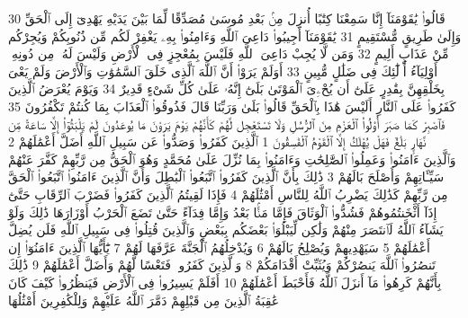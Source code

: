 {\tiny\colorbox{cl_aya}{30}} قَالُوا۟ يَٰقَوْمَنَآ إِنَّا سَمِعْنَا كِتَٰبًا أُنزِلَ مِنۢ بَعْدِ مُوسَىٰ مُصَدِّقًا لِّمَا بَيْنَ يَدَيْهِ يَهْدِىٓ إِلَى ٱلْحَقِّ وَإِلَىٰ طَرِيقٍ مُّسْتَقِيمٍ
{\tiny\colorbox{cl_aya}{31}} يَٰقَوْمَنَآ أَجِيبُوا۟ دَاعِىَ ٱللَّهِ وَءَامِنُوا۟ بِهِۦ يَغْفِرْ لَكُم مِّن ذُنُوبِكُمْ وَيُجِرْكُم مِّنْ عَذَابٍ أَلِيمٍ
{\tiny\colorbox{cl_aya}{32}} وَمَن لَّا يُجِبْ دَاعِىَ ٱللَّهِ فَلَيْسَ بِمُعْجِزٍ فِى ٱلْأَرْضِ وَلَيْسَ لَهُۥ مِن دُونِهِۦٓ أَوْلِيَآءُ أُو۟لَٰٓئِكَ فِى ضَلَٰلٍ مُّبِينٍ
{\tiny\colorbox{cl_aya}{33}} أَوَلَمْ يَرَوْا۟ أَنَّ ٱللَّهَ ٱلَّذِى خَلَقَ ٱلسَّمَٰوَٰتِ وَٱلْأَرْضَ وَلَمْ يَعْىَ بِخَلْقِهِنَّ بِقَٰدِرٍ عَلَىٰٓ أَن يُحْۦِىَ ٱلْمَوْتَىٰ بَلَىٰٓ إِنَّهُۥ عَلَىٰ كُلِّ شَىْءٍ قَدِيرٌ
{\tiny\colorbox{cl_aya}{34}} وَيَوْمَ يُعْرَضُ ٱلَّذِينَ كَفَرُوا۟ عَلَى ٱلنَّارِ أَلَيْسَ هَٰذَا بِٱلْحَقِّ قَالُوا۟ بَلَىٰ وَرَبِّنَا قَالَ فَذُوقُوا۟ ٱلْعَذَابَ بِمَا كُنتُمْ تَكْفُرُونَ
{\tiny\colorbox{cl_aya}{35}} فَٱصْبِرْ كَمَا صَبَرَ أُو۟لُوا۟ ٱلْعَزْمِ مِنَ ٱلرُّسُلِ وَلَا تَسْتَعْجِل لَّهُمْ كَأَنَّهُمْ يَوْمَ يَرَوْنَ مَا يُوعَدُونَ لَمْ يَلْبَثُوٓا۟ إِلَّا سَاعَةً مِّن نَّهَارٍۭ بَلَٰغٌ فَهَلْ يُهْلَكُ إِلَّا ٱلْقَوْمُ ٱلْفَٰسِقُونَ
{\tiny\colorbox{cl_aya}{1}} ٱلَّذِينَ كَفَرُوا۟ وَصَدُّوا۟ عَن سَبِيلِ ٱللَّهِ أَضَلَّ أَعْمَٰلَهُمْ
{\tiny\colorbox{cl_aya}{2}} وَٱلَّذِينَ ءَامَنُوا۟ وَعَمِلُوا۟ ٱلصَّٰلِحَٰتِ وَءَامَنُوا۟ بِمَا نُزِّلَ عَلَىٰ مُحَمَّدٍ وَهُوَ ٱلْحَقُّ مِن رَّبِّهِمْ كَفَّرَ عَنْهُمْ سَيِّـَٔاتِهِمْ وَأَصْلَحَ بَالَهُمْ
{\tiny\colorbox{cl_aya}{3}} ذَٰلِكَ بِأَنَّ ٱلَّذِينَ كَفَرُوا۟ ٱتَّبَعُوا۟ ٱلْبَٰطِلَ وَأَنَّ ٱلَّذِينَ ءَامَنُوا۟ ٱتَّبَعُوا۟ ٱلْحَقَّ مِن رَّبِّهِمْ كَذَٰلِكَ يَضْرِبُ ٱللَّهُ لِلنَّاسِ أَمْثَٰلَهُمْ
{\tiny\colorbox{cl_aya}{4}} فَإِذَا لَقِيتُمُ ٱلَّذِينَ كَفَرُوا۟ فَضَرْبَ ٱلرِّقَابِ حَتَّىٰٓ إِذَآ أَثْخَنتُمُوهُمْ فَشُدُّوا۟ ٱلْوَثَاقَ فَإِمَّا مَنًّۢا بَعْدُ وَإِمَّا فِدَآءً حَتَّىٰ تَضَعَ ٱلْحَرْبُ أَوْزَارَهَا ذَٰلِكَ وَلَوْ يَشَآءُ ٱللَّهُ لَٱنتَصَرَ مِنْهُمْ وَلَٰكِن لِّيَبْلُوَا۟ بَعْضَكُم بِبَعْضٍ وَٱلَّذِينَ قُتِلُوا۟ فِى سَبِيلِ ٱللَّهِ فَلَن يُضِلَّ أَعْمَٰلَهُمْ
{\tiny\colorbox{cl_aya}{5}} سَيَهْدِيهِمْ وَيُصْلِحُ بَالَهُمْ
{\tiny\colorbox{cl_aya}{6}} وَيُدْخِلُهُمُ ٱلْجَنَّةَ عَرَّفَهَا لَهُمْ
{\tiny\colorbox{cl_aya}{7}} يَٰٓأَيُّهَا ٱلَّذِينَ ءَامَنُوٓا۟ إِن تَنصُرُوا۟ ٱللَّهَ يَنصُرْكُمْ وَيُثَبِّتْ أَقْدَامَكُمْ
{\tiny\colorbox{cl_aya}{8}} وَٱلَّذِينَ كَفَرُوا۟ فَتَعْسًا لَّهُمْ وَأَضَلَّ أَعْمَٰلَهُمْ
{\tiny\colorbox{cl_aya}{9}} ذَٰلِكَ بِأَنَّهُمْ كَرِهُوا۟ مَآ أَنزَلَ ٱللَّهُ فَأَحْبَطَ أَعْمَٰلَهُمْ
{\tiny\colorbox{cl_aya}{10}} أَفَلَمْ يَسِيرُوا۟ فِى ٱلْأَرْضِ فَيَنظُرُوا۟ كَيْفَ كَانَ عَٰقِبَةُ ٱلَّذِينَ مِن قَبْلِهِمْ دَمَّرَ ٱللَّهُ عَلَيْهِمْ وَلِلْكَٰفِرِينَ أَمْثَٰلُهَا
